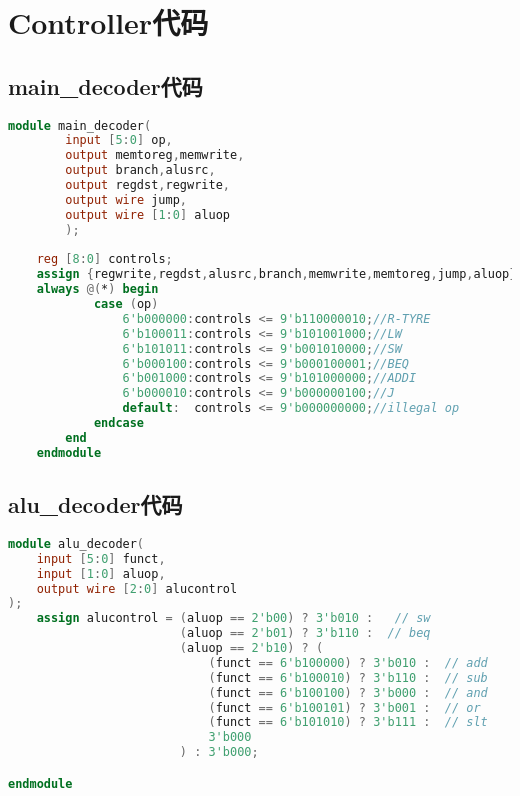 \appendix
\section{Controller代码}
\subsection{main\_decoder代码}
\begin{lstlisting}[language=Verilog]
    module main_decoder(
        input [5:0] op,
        output memtoreg,memwrite,
        output branch,alusrc,
        output regdst,regwrite,
        output wire jump,
        output wire [1:0] aluop
        );
        
    reg [8:0] controls;
    assign {regwrite,regdst,alusrc,branch,memwrite,memtoreg,jump,aluop} = controls;
    always @(*) begin
            case (op)
                6'b000000:controls <= 9'b110000010;//R-TYRE
                6'b100011:controls <= 9'b101001000;//LW
                6'b101011:controls <= 9'b001010000;//SW
                6'b000100:controls <= 9'b000100001;//BEQ
                6'b001000:controls <= 9'b101000000;//ADDI
                6'b000010:controls <= 9'b000000100;//J
                default:  controls <= 9'b000000000;//illegal op
            endcase
        end
    endmodule
\end{lstlisting}

\subsection{alu\_decoder代码}
\begin{lstlisting}[language=Verilog]
module alu_decoder(
    input [5:0] funct,
    input [1:0] aluop,
    output wire [2:0] alucontrol
);
    assign alucontrol = (aluop == 2'b00) ? 3'b010 :   // sw
                        (aluop == 2'b01) ? 3'b110 :  // beq
                        (aluop == 2'b10) ? (
                            (funct == 6'b100000) ? 3'b010 :  // add
                            (funct == 6'b100010) ? 3'b110 :  // sub
                            (funct == 6'b100100) ? 3'b000 :  // and
                            (funct == 6'b100101) ? 3'b001 :  // or
                            (funct == 6'b101010) ? 3'b111 :  // slt
                            3'b000
                        ) : 3'b000;

endmodule
\end{lstlisting}
